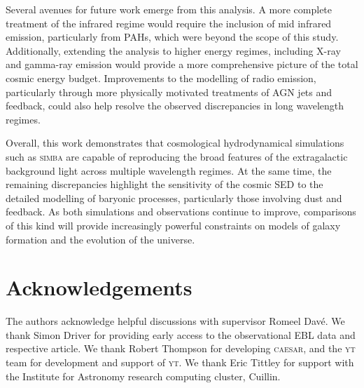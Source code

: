 \documentclass[
    a4paper, %
    10pt, %
    unnumberedsections, %
]{LTJournalArticle}
\begin{document}
Several avenues for future work emerge from this analysis. A more complete treatment of the infrared regime would require the inclusion of mid infrared emission, particularly from PAHs, which were beyond the scope of this study. Additionally, extending the analysis to higher energy regimes, including X-ray and gamma-ray emission would provide a more comprehensive picture of the total cosmic energy budget. Improvements to the modelling of radio emission, particularly through more physically motivated treatments of AGN jets and feedback, could also help resolve the observed discrepancies in long wavelength regimes.

Overall, this work demonstrates that cosmological hydrodynamical simulations such as \textsc{simba} are capable of reproducing the broad features of the extragalactic background light across multiple wavelength regimes. At the same time, the remaining discrepancies highlight the sensitivity of the cosmic SED to the detailed modelling of baryonic processes, particularly those involving dust and feedback. As both simulations and observations continue to improve, comparisons of this kind will provide increasingly powerful constraints on models of galaxy formation and the evolution of the universe.

\section{Acknowledgements}
The authors acknowledge helpful discussions with supervisor Romeel Davé. We thank Simon Driver for providing early access to the observational EBL data and respective article. We thank Robert Thompson for developing \textsc{caesar}, and the \textsc{yt} team for development and support of \textsc{yt}. We thank Eric Tittley for support with the Institute for Astronomy research computing cluster, Cuillin.
 
\renewcommand{\refname}{References}
\printbibliography
\end{document}
